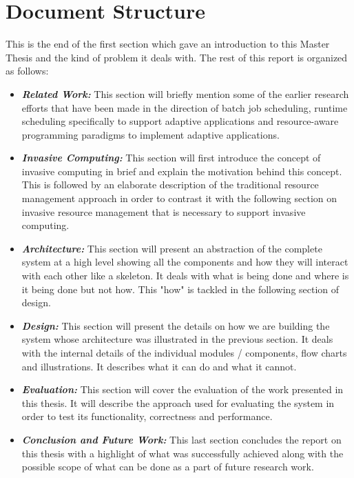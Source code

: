 \section{Document Structure}
This is the end of the first section which gave an introduction to this Master Thesis and the kind of problem it deals with. The rest of this report is organized as follows:
\begin{itemize}
\item \textbf{\textit{Related Work:}} This section will briefly mention some of the earlier research efforts that have been made in the direction of batch job scheduling, runtime scheduling specifically to support adaptive applications and resource-aware programming paradigms to implement adaptive applications. 
\item \textbf{\textit{Invasive Computing:}} This section will first introduce the concept of invasive computing in brief and explain the motivation behind this concept. This is followed by an elaborate description of the traditional resource management approach in order to contrast it with the following section on invasive resource management that is necessary to support invasive computing. 
\item \textbf{\textit{Architecture:}} This section will present an abstraction of the complete system at a high level showing all the components and how they will interact with each other like a skeleton. It deals with what is being done and where is it being done but not how. This "how" is tackled in the following section of design.
\item \textbf{\textit{Design:}} This section will present the details on how we are building the system whose architecture was illustrated in the previous section. It deals with the internal details of the individual modules / components, flow charts and illustrations. It describes what it can do and what it cannot.
\item \textbf{\textit{Evaluation:}} This section will cover the evaluation of the work presented in this thesis. It will describe the approach used for evaluating the system in order to test its functionality, correctness and performance.
\item \textbf{\textit{Conclusion and Future Work:}} This last section concludes the report on this thesis with a highlight of what was successfully achieved along with the possible scope of what can be done as a part of future research work.
\end{itemize}
